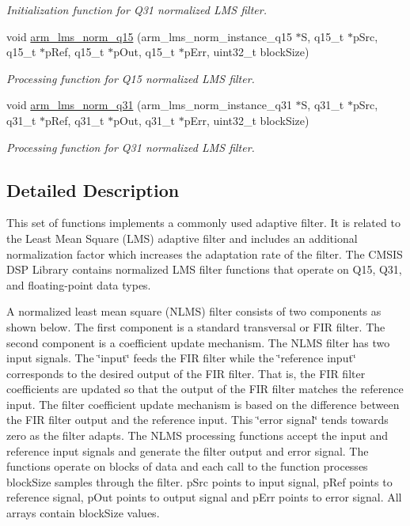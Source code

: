 \begin{DoxyCompactItemize}
\begin{DoxyCompactList}\small\item\em Initialization function for Q31 normalized L\+MS filter. \end{DoxyCompactList}\item 
void \hyperlink{group__LMS__NORM_gad47486a399dedb0bc85a5990ec5cf981}{arm\+\_\+lms\+\_\+norm\+\_\+q15} (arm\+\_\+lms\+\_\+norm\+\_\+instance\+\_\+q15 $\ast$S, q15\+\_\+t $\ast$p\+Src, q15\+\_\+t $\ast$p\+Ref, q15\+\_\+t $\ast$p\+Out, q15\+\_\+t $\ast$p\+Err, uint32\+\_\+t block\+Size)
\begin{DoxyCompactList}\small\item\em Processing function for Q15 normalized L\+MS filter. \end{DoxyCompactList}\item 
void \hyperlink{group__LMS__NORM_ga7128775e99817c183a7d7ad34e8b6e05}{arm\+\_\+lms\+\_\+norm\+\_\+q31} (arm\+\_\+lms\+\_\+norm\+\_\+instance\+\_\+q31 $\ast$S, q31\+\_\+t $\ast$p\+Src, q31\+\_\+t $\ast$p\+Ref, q31\+\_\+t $\ast$p\+Out, q31\+\_\+t $\ast$p\+Err, uint32\+\_\+t block\+Size)
\begin{DoxyCompactList}\small\item\em Processing function for Q31 normalized L\+MS filter. \end{DoxyCompactList}\end{DoxyCompactItemize}


\subsection{Detailed Description}
This set of functions implements a commonly used adaptive filter. It is related to the Least Mean Square (L\+MS) adaptive filter and includes an additional normalization factor which increases the adaptation rate of the filter. The C\+M\+S\+IS D\+SP Library contains normalized L\+MS filter functions that operate on Q15, Q31, and floating-\/point data types.

A normalized least mean square (N\+L\+MS) filter consists of two components as shown below. The first component is a standard transversal or F\+IR filter. The second component is a coefficient update mechanism. The N\+L\+MS filter has two input signals. The \char`\"{}input\char`\"{} feeds the F\+IR filter while the \char`\"{}reference input\char`\"{} corresponds to the desired output of the F\+IR filter. That is, the F\+IR filter coefficients are updated so that the output of the F\+IR filter matches the reference input. The filter coefficient update mechanism is based on the difference between the F\+IR filter output and the reference input. This \char`\"{}error signal\char`\"{} tends towards zero as the filter adapts. The N\+L\+MS processing functions accept the input and reference input signals and generate the filter output and error signal.  The functions operate on blocks of data and each call to the function processes {\ttfamily block\+Size} samples through the filter. {\ttfamily p\+Src} points to input signal, {\ttfamily p\+Ref} points to reference signal, {\ttfamily p\+Out} points to output signal and {\ttfamily p\+Err} points to error signal. All arrays contain {\ttfamily block\+Size} values.


